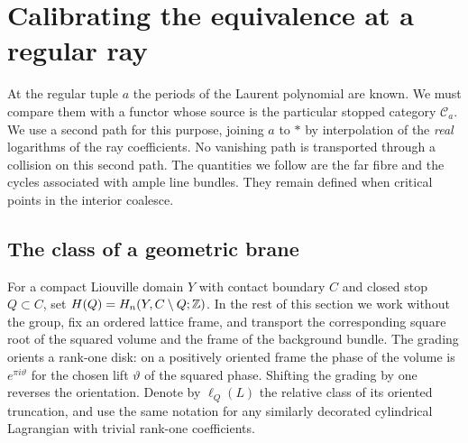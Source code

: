 \section{Calibrating the equivalence at a regular ray}\label{sec:raycalibration}

At the regular tuple $a$ the periods of the Laurent polynomial are known. We must compare them with a functor whose source is the particular stopped category $\mathcal C_a$. We use a second path for this purpose, joining $a$ to $*$ by interpolation of the \emph{real} logarithms of the ray coefficients. No vanishing path is transported through a collision on this second path. The quantities we follow are the far fibre and the cycles associated with ample line bundles. They remain defined when critical points in the interior coalesce.

\subsection{The class of a geometric brane}
For a compact Liouville domain $Y$ with contact boundary $C$ and closed stop $Q\subset C$, set $H(Q)=H_n(Y,C\setminus Q;\mathbb Z)$. In the rest of this section we work without the group, fix an ordered lattice frame, and transport the corresponding square root of the squared volume and the frame of the background bundle. The grading orients a rank-one disk: on a positively oriented frame the phase of the volume is $e^{\pi i\vartheta}$ for the chosen lift $\vartheta$ of the squared phase. Shifting the grading by one reverses the orientation. Denote by $\ell_Q(L)$ the relative class of its oriented truncation, and use the same notation for any similarly decorated cylindrical Lagrangian with trivial rank-one coefficients.

